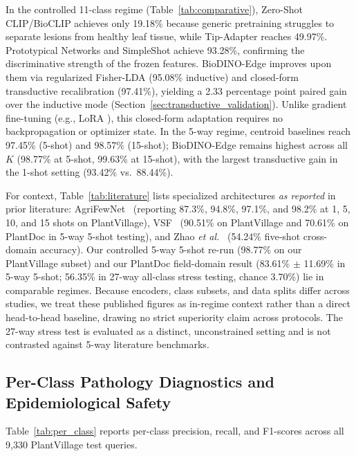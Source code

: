 \documentclass[preprint,12pt]{elsarticle}
\begin{document}
In the controlled 11-class regime (Table~\ref{tab:comparative}), Zero-Shot CLIP/BioCLIP achieves only 19.18\% because generic pretraining struggles to separate lesions from healthy leaf tissue, while Tip-Adapter reaches 49.97\%. Prototypical Networks and SimpleShot achieve 93.28\%, confirming the discriminative strength of the frozen features. BioDINO-Edge improves upon them via regularized Fisher-LDA (95.08\% inductive) and closed-form transductive recalibration (97.41\%), yielding a 2.33 percentage point paired gain over the inductive mode (Section~\ref{sec:transductive_validation}). Unlike gradient fine-tuning (e.g., LoRA \cite{hu2022lora}), this closed-form adaptation requires no backpropagation or optimizer state. In the 5-way regime, centroid baselines reach 97.45\% (5-shot) and 98.57\% (15-shot); BioDINO-Edge remains highest across all $K$ (98.77\% at 5-shot, 99.63\% at 15-shot), with the largest transductive gain in the 1-shot setting (93.42\% vs.\ 88.44\%).

For context, Table~\ref{tab:literature} lists specialized architectures \emph{as reported} in prior literature: AgriFewNet~\cite{babu2025agrifewnet} (reporting 87.3\%, 94.8\%, 97.1\%, and 98.2\% at 1, 5, 10, and 15 shots on PlantVillage), VSF~\cite{zhou2026vsf} (90.51\% on PlantVillage and 70.61\% on PlantDoc in 5-way 5-shot testing), and Zhao \textit{et al.}~\cite{zhao2026lightweight} (54.24\% five-shot cross-domain accuracy). Our controlled 5-way 5-shot re-run (98.77\% on our PlantVillage subset) and our PlantDoc field-domain result (83.61\% $\pm$ 11.69\% in 5-way 5-shot; 56.35\% in 27-way all-class stress testing, chance 3.70\%) lie in comparable regimes. Because encoders, class subsets, and data splits differ across studies, we treat these published figures as in-regime context rather than a direct head-to-head baseline, drawing no strict superiority claim across protocols. The 27-way stress test is evaluated as a distinct, unconstrained setting and is not contrasted against 5-way literature benchmarks.

\subsection{Per-Class Pathology Diagnostics and Epidemiological Safety}
\label{sec:per_class}
Table~\ref{tab:per_class} reports per-class precision, recall, and F1-scores across all 9,330 PlantVillage test queries.
\end{document}
